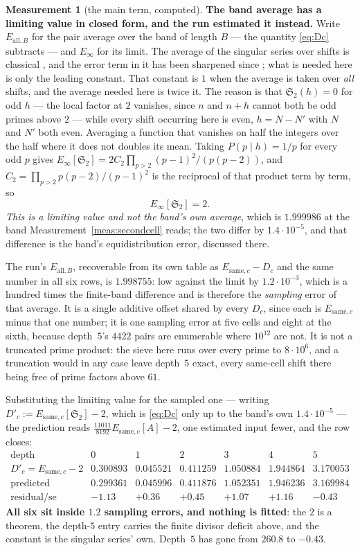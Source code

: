 \documentclass[11pt,a4paper]{article}
\theoremstyle{plain}
\theoremstyle{definition}
\newtheorem{measurement}[theorem]{Measurement}
\theoremstyle{remark}
\renewcommand{\SS}{\mathfrak{S}}
\begin{document}
\begin{measurement}[the main term, computed]
\textbf{The band average has a limiting value in closed form, and the
run estimated it instead.} Write $E_{\mathrm{all},B}$ for the pair
average over the band of length $B$ --- the quantity
\eqref{eq:Dc} subtracts --- and $E_\infty$ for its limit. The average
of the singular series over shifts is classical \cite{Gallagher}, and
the error term in it has been sharpened since \cite{Pintz}; what is
needed here is only the leading constant. That constant is $1$ when the
average is taken over \emph{all} shifts, and the average needed here is
twice it. The reason is that $\SS_2(h)=0$ for odd $h$ --- the local
factor at $2$ vanishes, since $n$ and $n+h$ cannot both be odd primes
above $2$ --- while every shift occurring here is even, $h=N-N'$ with
$N$ and $N'$ both even. Averaging a function that vanishes on half the
integers over the half where it does not doubles its mean. Taking
$P(p\mid h)=1/p$ for every odd $p$ gives
$E_\infty[\SS_2]=2C_2\prod_{p>2}(p-1)^2/(p(p-2))$, and
$C_2=\prod_{p>2}p(p-2)/(p-1)^2$ is the reciprocal of that product term
by term, so
\[
  E_\infty[\SS_2]=2 .
\]
\emph{This is a limiting value and not the band's own average}, which is
$1.999986$ at the band Measurement~\ref{meas:secondcell} reads; the two
differ by $1.4\cdot10^{-5}$, and that difference is the band's
equidistribution error, discussed there.

The run's $E_{\mathrm{all},B}$, recoverable from its own table as
$E_{\mathrm{same},c}-D_c$ and the same number in all six rows, is
$1.998755$: low against the limit by $1.2\cdot10^{-3}$, which is a
hundred times the finite-band difference and is therefore the
\emph{sampling} error of that average. It is a single additive offset
shared by every $D_c$, since each is $E_{\mathrm{same},c}$ minus that
one number; it is one sampling error at five cells and eight at the
sixth, because depth~$5$'s $4422$ pairs are enumerable where $10^{12}$
are not. It is not a truncated prime product: the sieve here runs over
every prime to $8\cdot10^6$, and a truncation would in any case leave
depth~$5$ exact, every same-cell shift there being free of prime
factors above $61$.

Substituting the limiting value for the sampled one --- writing
$D'_c:=E_{\mathrm{same},c}[\SS_2]-2$, which is \eqref{eq:Dc} only up to
the band's own $1.4\cdot10^{-5}$ --- the prediction reads
$\tfrac{11011}{8192}E_{\mathrm{same},c}[A]-2$, one estimated input
fewer, and
the row closes:
\[
\begin{array}{r|cccccc}
 \text{depth} & 0 & 1 & 2 & 3 & 4 & 5\\\hline
 D'_c=E_{\mathrm{same},c}-2 & 0.300893 & 0.045521 & 0.411259 & 1.050884
   & 1.944864 & 3.170053\\
 \text{predicted} & 0.299361 & 0.045996 & 0.411876 & 1.052351
   & 1.946236 & 3.169984\\
 \text{residual}/\mathrm{se} & -1.13 & +0.36 & +0.45 & +1.07 & +1.16
   & -0.43
\end{array}
\]
\textbf{All six sit inside $1.2$ sampling errors, and nothing is
fitted}: the $2$ is a theorem, the depth-$5$ entry carries the finite
divisor deficit above, and the constant is the singular series' own.
Depth~$5$ has gone from $260.8$ to $-0.43$.


\end{measurement}
\end{document}
